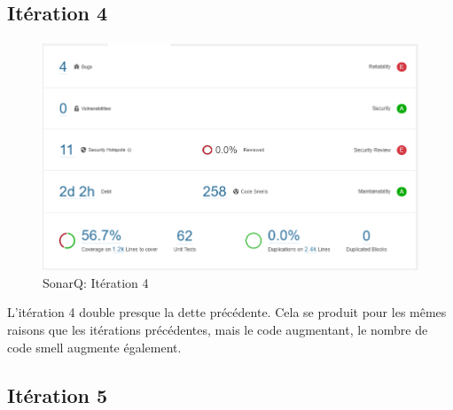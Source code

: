 \documentclass[13pt ,a4paper ]{report}
\begin{document}
\begin{multicols}{2}
	\subsection{Itération 4}
	\paragraph{}
        \begin{figure}[H]
      	\begin{center}
			\includegraphics[scale=0.3]{4.png}
			\caption{SonarQ: Itération 4}
		\end{center}
		\end{figure}

L’itération 4 double presque la dette précédente. Cela se produit pour les mêmes raisons que les itérations précédentes, mais le code augmentant, le nombre de code smell augmente également.
  		\subsection{Itération 5}

\end{multicols}
\end{document}
